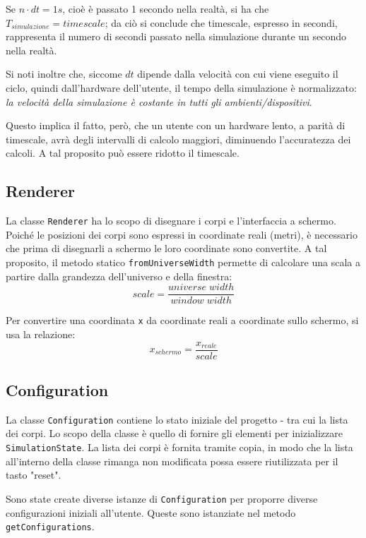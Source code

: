 \documentclass{article}
\begin{document}
 Se $n \cdot dt = 1 s$, cioè è passato 1 secondo nella realtà, si ha che $T_{simulazione} = timescale$; da ciò si conclude che timescale, espresso in secondi, rappresenta il numero di secondi passato nella simulazione durante un secondo nella realtà.

Si noti inoltre che, siccome $dt$ dipende dalla velocità con cui viene eseguito il ciclo, quindi dall'hardware dell'utente, il tempo della simulazione è normalizzato: \textit{la velocità della simulazione è costante in tutti gli ambienti/dispositivi}.

Questo implica il fatto, però, che un utente con un hardware lento, a parità di timescale, avrà degli intervalli di calcolo maggiori, diminuendo l'accuratezza dei calcoli. A tal proposito può essere ridotto il timescale.

\subsection{Renderer}
La classe \verb|Renderer| ha lo scopo di disegnare i corpi e l'interfaccia a schermo. Poiché le posizioni dei corpi sono espressi in coordinate reali (metri), è necessario che prima di disegnarli a schermo le loro coordinate sono convertite. A tal proposito, il metodo statico \verb|fromUniverseWidth| permette di calcolare una scala a partire dalla grandezza dell'universo e della finestra:
\begin{equation*}
    scale = \frac{universe\;width}{window\;width}
\end{equation*}

Per convertire una coordinata \verb|x| da coordinate reali a coordinate sullo schermo, si usa la relazione:
\begin{equation*}
    x_{schermo} = \frac{x_{reale}}{scale}
\end{equation*}

\subsection{Configuration}
La classe \verb|Configuration| contiene lo stato iniziale del progetto - tra cui la lista dei corpi. Lo scopo della classe è quello di fornire gli elementi per inizializzare \verb|SimulationState|. La lista dei corpi è fornita tramite copia, in modo che la lista all'interno della classe rimanga non modificata possa essere riutilizzata per il tasto "reset".

Sono state create diverse istanze di \verb|Configuration| per proporre diverse configurazioni iniziali all'utente. Queste sono istanziate nel metodo \verb|getConfigurations|.
\end{document}
